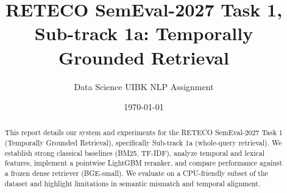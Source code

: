 \documentclass[11pt, a4paper]{article}
\title{RETECO SemEval-2027 Task 1, Sub-track 1a: Temporally Grounded Retrieval}
\author{Data Science UIBK NLP Assignment}
\date{\today}
\begin{document}
\maketitle

\begin{abstract}
This report details our system and experiments for the RETECO SemEval-2027 Task 1 (Temporally Grounded Retrieval), specifically Sub-track 1a (whole-query retrieval). We establish strong classical baselines (BM25, TF-IDF), analyze temporal and lexical features, implement a pointwise LightGBM reranker, and compare performance against a frozen dense retriever (BGE-small). We evaluate on a CPU-friendly subset of the dataset and highlight limitations in semantic mismatch and temporal alignment.
\end{abstract}















\end{document}
